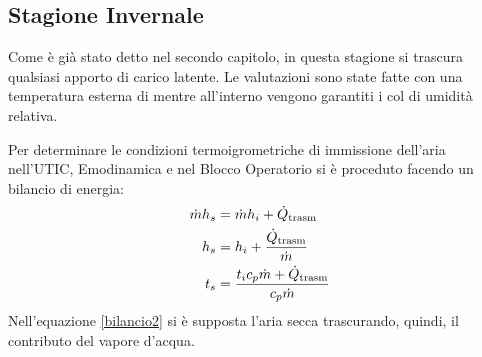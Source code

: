 \subsection{Stagione Invernale}
Come è già stato detto nel secondo capitolo, in questa stagione si trascura qualsiasi apporto di carico latente. Le valutazioni sono state fatte con una temperatura esterna di  mentre all'interno vengono garantiti i  col  di umidità relativa.

Per determinare le condizioni termoigrometriche di immissione dell'aria nell'UTIC, Emodinamica e nel Blocco Operatorio si è proceduto facendo un bilancio di energia:
\begin{align}
\dot{m}h_s	&	=\dot{m}h_i+\dot{Q}_{\mathrm{trasm}}		\label{bilancio}\\
h_s			&	=h_i+\frac{\dot{Q}_{\mathrm{trasm}}}{\dot{m}}	\notag\\
t_s			&	=\frac{t_ic_p\dot{m}+\dot{Q}_{\mathrm{trasm}}}{c_p\dot{m}}\label{bilancio2}
\end{align}
Nell'equazione \vref{bilancio2} si è supposta l'aria secca trascurando, quindi, il contributo del vapore d'acqua.

